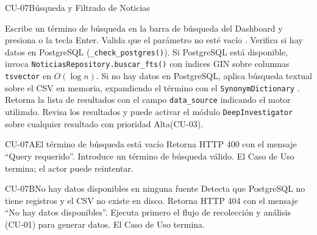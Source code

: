 \begin{UseCase}{CU-07}{Búsqueda y Filtrado de Noticias}
{	}
\end{UseCase}

\begin{UCtrayectoria}
	\UCpaso[\UCActor] Escribe un término de búsqueda en la barra de búsqueda del Dashboard y presiona  o la tecla Enter.
	\UCpaso[\UCsist] Valida que el parámetro  no esté vacío .
	\UCpaso[\UCsist] Verifica si hay datos en PostgreSQL (\texttt{\_check\_postgres()}).
	\UCpaso[\UCsist] Si PostgreSQL está disponible, invoca \texttt{NoticiasRepository.buscar\_fts()} con índices GIN sobre columnas \texttt{tsvector} en $O(\log n)$.
	\UCpaso[\UCsist] Si no hay datos en PostgreSQL, aplica búsqueda textual sobre el CSV en memoria, expandiendo el término con el \texttt{SynonymDictionary} .
	\UCpaso[\UCsist] Retorna la lista de resultados con el campo \texttt{data\_source} indicando el motor utilizado.
	\UCpaso[\UCActor] Revisa los resultados y puede activar el módulo \texttt{DeepInvestigator} sobre cualquier resultado con prioridad Alta(CU-03).
\end{UCtrayectoria}

\begin{UCtrayectoriaA}{CU-07}{A}{El término de búsqueda está vacío}
	\UCpaso[\UCsist] Retorna HTTP 400 con el mensaje ``Query requerido''.
	\UCpaso[\UCActor] Introduce un término de búsqueda válido.
	\UCpaso[] El Caso de Uso termina; el actor puede reintentar.
\end{UCtrayectoriaA}

\begin{UCtrayectoriaA}{CU-07}{B}{No hay datos disponibles en ninguna fuente}
	\UCpaso[\UCsist] Detecta que PostgreSQL no tiene registros y el CSV no existe en disco.
	\UCpaso[\UCsist] Retorna HTTP 404 con el mensaje ``No hay datos disponibles''.
	\UCpaso[\UCActor] Ejecuta primero el flujo de recolección y análisis (CU-01) para generar datos.
	\UCpaso[] El Caso de Uso termina.
\end{UCtrayectoriaA}

